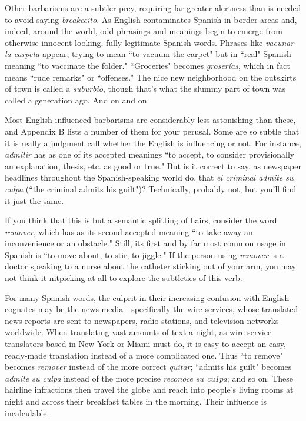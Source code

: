 Other barbarisms are a subtler prey, requiring far greater alertness than is needed to avoid saying \emph{breakecito}. As English contaminates Spanish in border areas and, indeed, around the world, odd phrasings and meanings begin to emerge from otherwise innocent-looking,
fully legitimate Spanish words. Phrases like \emph{vacunar la carpeta} appear,
trying to mean ``to vacuum the carpet" but in ``real" Spanish meaning
``to vaccinate the folder." ``Groceries" becomes \emph{groserías}, which in
fact means ``rude remarks" or ``offenses." The nice new neighborhood
on the outskirts of town is called a \emph{suburbio}, though that's what the
slummy part of town was called a generation ago. And on and on.

Most English-influenced barbarisms are considerably less astonishing than these, and Appendix B lists a number of them for your
perusal. Some are so subtle that it is really a judgment call whether
the English is influencing or not. For instance, \emph{admitir} has as one of
its accepted meanings ``to accept, to consider provisionally an explanation, thesis, etc. as good or true." But is it correct to say, as newspaper
headlines throughout the Spanish-speaking world do, that \emph{el criminal
admite su culpa} (``the criminal admits his guilt")? Technically, probably not, but you'll find it just the same.

If you think that this is but a semantic splitting of hairs, consider the word \emph{remover}, which has as its second accepted meaning ``to
take away an inconvenience or an obstacle." Still, its first and by far
most common usage in Spanish is ``to move about, to stir, to jiggle."
If the person using \emph{remover} is a doctor speaking to a nurse about the
catheter sticking out of your arm, you may not think it nitpicking at
all to explore the subtleties of this verb.

For many Spanish words, the culprit in their increasing confusion with English cognates may be the news media---specifically the
wire services, whose translated news reports are sent to newspapers,
radio stations, and television networks worldwide. When translating
vast amounts of text a night, as wire-service translators based in New
York or Miami must do, it is easy to accept an easy, ready-made translation instead of a more complicated one. Thus ``to remove" becomes
\emph{remover} instead of the more correct \emph{quitar}; ``admits his guilt" becomes \emph{admite su culpa} instead of the more precise \emph{reconoce su cu1pa};
and so on. These hairline infractions then travel the globe and reach
into people's living rooms at night and across their breakfast tables in
the morning. Their influence is incalculable.

